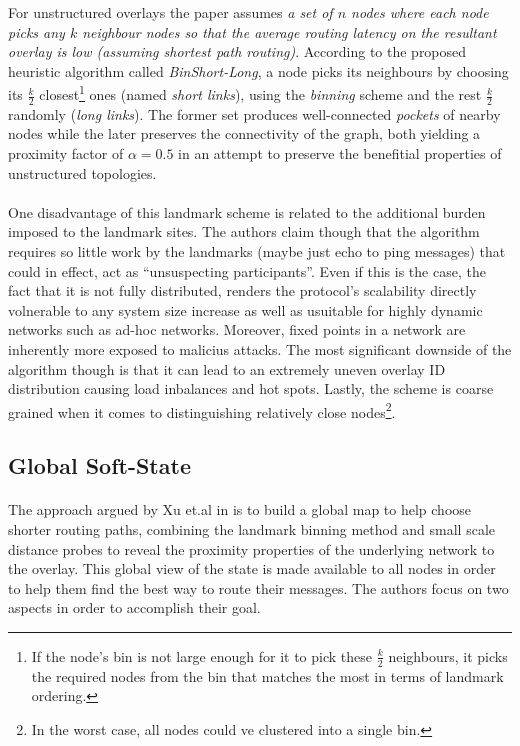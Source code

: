 \documentclass[a4paper,10pt]{article}
\begin{document}
For unstructured overlays the paper assumes \emph{a set of $n$ nodes where each node picks any $k$ neighbour nodes so that the average routing latency on the resultant overlay is low (assuming shortest path routing)}. According to the proposed heuristic algorithm called \emph{BinShort-Long}, a node picks its neighbours by choosing its $\frac{k}{2}$ closest\footnote{If the node's bin is not large enough for it to pick these $\frac{k}{2}$ neighbours, it picks the required nodes from the bin that matches the most in terms of landmark ordering.} ones (named \emph{short links}), using the \emph{binning} scheme and the rest $\frac{k}{2}$ randomly (\emph{long links}). The former set produces well-connected \emph{pockets} of nearby nodes while the later preserves the connectivity of the graph, both yielding a proximity factor of $\alpha = 0.5$ in an attempt to preserve the benefitial properties of unstructured topologies\cite{merugu_str2unstr_2003}.

\paragraph{}
One disadvantage of this landmark scheme is related to the additional burden imposed to the landmark sites. The authors claim though that the algorithm requires so little work by the landmarks (maybe just echo to ping messages) that could in effect, act as ``unsuspecting participants''. Even if this is the case, the fact that it is not fully distributed, renders the protocol's scalability directly volnerable to any system size increase as well as usuitable for highly dynamic networks such as ad-hoc networks. Moreover, fixed points in a network are inherently more exposed to malicius attacks. The most significant downside of the algorithm though is that it can lead to an extremely uneven overlay ID distribution causing load inbalances and hot spots. Lastly, the scheme is coarse grained when it comes to distinguishing relatively close nodes\footnote{In the worst case, all nodes could ve clustered into a single bin.}.

\subsection{Global Soft-State}

\paragraph{}
The approach argued by Xu et.al in \cite{xu_globstate_2003} is to build a global map to help choose shorter routing paths, combining the landmark binning method and small scale distance probes to reveal the proximity properties of the underlying network to the overlay. This global view of the state is made available to all nodes in order to help them find the best way to route their messages. The authors focus on two aspects in order to accomplish their goal.
\end{document}
